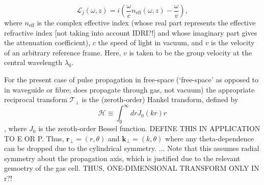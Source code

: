 \documentclass[a4paper]{jpconf}
\begin{document}
\begin{equation}
\mathcal{L}_j(\omega, z) = i \left( \frac{\omega}{c} n_{\text{eff}}(\omega,z) - \frac{\omega}{v} \right),
\end{equation}
where $n_\text{eff}$ is the complex effective index (whose real part represents the effective refractive index [not taking into account IDRI?!] and whose imaginary part gives the attenuation coefficient), $c$ the speed of light in vacuum, and $v$ is the velocity of an arbitrary reference frame. Here, $v$ is taken to be the group velocity at the central wavelength $\lambda_0$. \par 
For the present case of pulse propagation in free-space (`free-space' as opposed to in waveguide or fibre; does propagate through gas, not vacuum) the appropriate reciprocal transform $\mathcal{T}_\perp$ is the (zeroth-order) Hankel transform, defined by
\begin{equation}
\mathcal{H} \equiv \int_0^\infty dr J_0 (kr)r
\end{equation},
where $J_0$ is the zeroth-order Bessel function. DEFINE THIS IN APPLICATION TO E OR P. Thus, $\mathbf{r}_\perp = (r, \theta)$ and $\mathbf{k}_\perp = (k, \theta)$ where any theta-dependence can be dropped due to the cylindrical symmetry. 
...
Note that this assumes radial symmetry about the propagation axis, which is justified due to the relevant gemoetry of the gas cell. THUS, ONE-DIMENSIONAL TRANSFORM ONLY IN r?!
\end{document}
